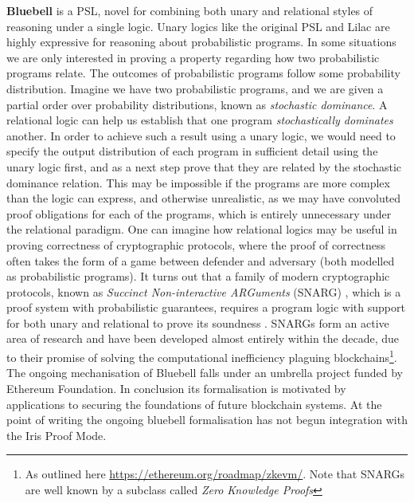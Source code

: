 \textbf{Bluebell} \citep{bluebell} is a PSL, novel for combining both unary and relational styles of reasoning under a single logic. Unary logics like the original PSL \citep{og_psl} and Lilac are
highly expressive for reasoning about probabilistic programs. In some situations we are only interested in proving a property regarding how two probabilistic programs relate.
The outcomes of probabilistic programs follow some probability distribution. Imagine we have two probabilistic programs, and we are given a partial
order over probability distributions, known as \emph{stochastic dominance}. A relational logic can help us establish that one program \emph{stochastically dominates} another.
In order to achieve such a result using a unary logic, we would need to specify the output distribution of each program in sufficient detail using the unary logic first, 
and as a next step prove that they are related by the stochastic dominance relation. This may be impossible if the programs are more complex than the logic can express, and otherwise
unrealistic, as we  may have convoluted proof obligations for each of the programs, which is entirely unnecessary under the relational paradigm. One can imagine how
relational logics may be useful in proving correctness of cryptographic protocols, where the proof of correctness often takes the form of a game between defender and adversary
(both modelled as probabilistic programs). It turns out that a family of modern cryptographic protocols, known as \emph{Succinct Non-interactive ARGuments} (SNARG) \citep{snarg},
which is a proof system with probabilistic guarantees, requires a program logic with support for both unary and relational to prove its soundness \citep{vcvio}.
SNARGs form an active area of research and have been developed almost entirely within the decade, due to their promise of solving the computational inefficiency plaguing
blockchains\footnote{As outlined here \url{https://ethereum.org/roadmap/zkevm/}. Note that SNARGs are well known by a subclass called \emph{Zero Knowledge Proofs}}.
The ongoing mechanisation of Bluebell \citep{bluebell-impl} falls under an umbrella project funded by Ethereum Foundation. In conclusion its formalisation
is motivated by applications to securing the foundations of future blockchain systems. At the point of writing the ongoing bluebell formalisation has not begun integration
with the Iris Proof Mode.

